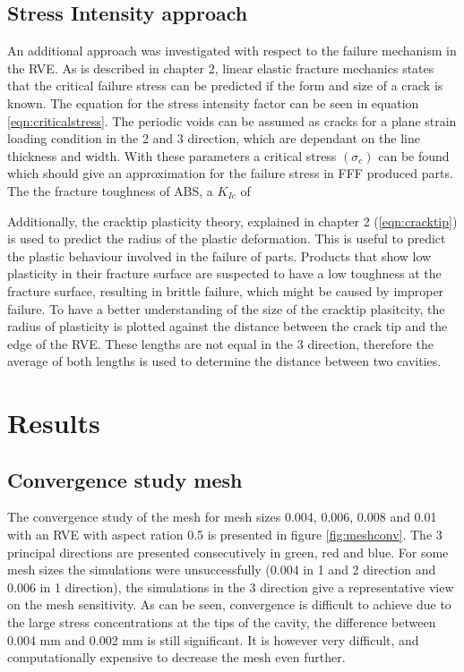 \subsection{Stress Intensity approach}
An additional approach was investigated with respect to the failure mechanism in the RVE. As is described in chapter 2, linear elastic fracture mechanics states that the critical failure stress can be predicted if the form and size of a crack is known. The equation for the stress intensity factor can be seen in equation \ref{eqn:criticalstress}. The periodic voids can be assumed as cracks for a plane strain loading condition in the 2 and 3 direction, which are dependant on the line thickness and width. With these parameters a critical stress $(\sigma_c)$ can be found which should give an approximation for the failure stress in FFF produced parts.  The the fracture toughness of ABS, a $K_{Ic}$ of 

Additionally, the cracktip plasticity theory, explained in chapter 2 (\ref{eqn:cracktip}) is used to predict the radius of the plastic deformation. This is useful to predict the plastic behaviour involved in the failure of parts. Products that show low plasticity in their fracture surface are suspected to have a low toughness at the fracture surface, resulting in brittle failure, which might be caused by improper failure. To have a better understanding of the size of the cracktip plasitcity, the radius of plasticity is plotted against the distance between the crack tip and the edge of the RVE. These lengths are not equal in the 3 direction, therefore the average of both lengths is used to determine the distance between two cavities. 

\section{Results}
\subsection{Convergence study mesh}
The convergence study of the mesh for mesh sizes 0.004, 0.006, 0.008 and 0.01 with an RVE with aspect ration 0.5 is presented in figure \ref{fig:meshconv}. The 3 principal directions are presented consecutively in green, red and blue. For some mesh sizes the simulations were unsuccessfully (0.004 in 1 and 2 direction and 0.006 in 1 direction), the simulations in the 3 direction give a representative view on the mesh sensitivity.  As can be seen,  convergence is difficult to achieve due to the large stress concentrations at the tips of the cavity, the difference between 0.004 mm and 0.002 mm is still significant. It is however very difficult, and computationally expensive to decrease the mesh even further.  

